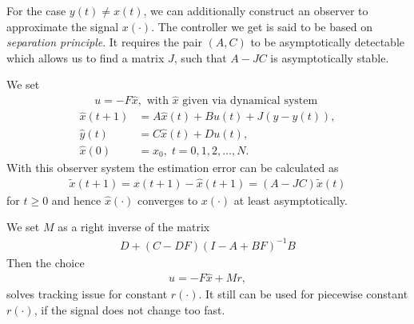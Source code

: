 For the case $y(t) \neq x(t)$, we can additionally construct an observer to approximate the signal $x(\cdot)$. The  controller we get is said to be based on \textit{separation principle}.
It requires the pair $(A,C)$ to be asymptotically detectable 
which allows us to find a matrix $J$, such that $A - JC$ is asymptotically stable.

We set 
\begin{align}
u= -F \hat{x}, \text{ with } \hat{x} \text{ given via dynamical system }
\end{align}
\begin{align}
\hat{x}(t+1) &= A\hat{x}(t) + B u(t) + J (y - \hat{y}(t)), \\
\hat{y}(t) & = C\hat{x}(t) + D u(t), \\
\hat{x}(0)& = x_0, \; t = 0,1,2, \dots , N.
\end{align}
With this observer system the estimation error can be calculated as \begin{align}
\tilde{x}(t+1) = x(t+1) - \hat{x}(t+1) = (A - JC) \tilde{x}(t)
\end{align} for $t \geq 0$ and hence $\hat{x} (\cdot)$ converges to $x(\cdot)$ at least asymptotically. 

We set $M$ as a right inverse of the matrix 
\begin{align}
D + (C - D F) (I - A + B F)^{-1} B
\end{align}
Then the choice
\begin{align}
u = -F\hat{x} + Mr, 
\end{align}
solves tracking issue for constant $r(\cdot)$. It still can be used for piecewise constant $r(\cdot)$, if the signal does not change too fast.















 
 
 










